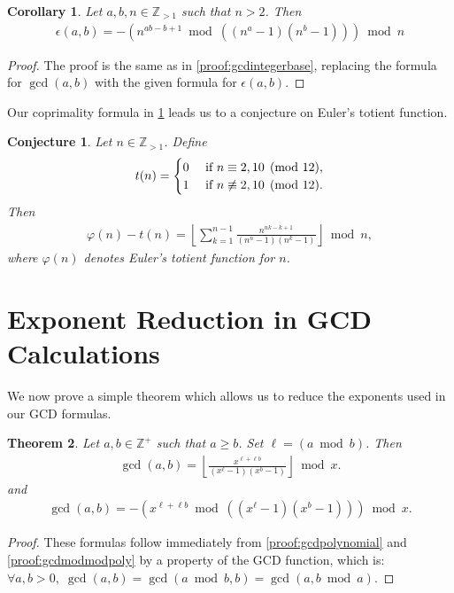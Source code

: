 \documentclass{article}
\theoremstyle{plain}
\newtheorem{conjecture}{Conjecture}
\newtheorem{theorem}{Theorem}
\newtheorem{corollary}[theorem]{Corollary}
\theoremstyle{definition}
\newcommand{\floor}[1]{\left\lfloor #1 \right\rfloor}
\newcommand{\coprime}{\epsilon}
\newcommand{\Z}{\mathbb{Z}}
\begin{document}
\begin{corollary} \label{proof:coprimalityfunctionintegerbase}
Let $a,b,n \in \Z_{>1}$ such that $n > 2$. Then
\begin{align*}
    \coprime(a,b) = -\left( n^{ab-b+1} \bmod \left((n^a-1)(n^b-1)\right) \right) \bmod n 
\end{align*}
\end{corollary}
\begin{proof}
The proof is the same as in \cref{proof:gcdintegerbase}, replacing the formula for $\gcd(a,b)$ with the given formula for $\coprime(a,b)$.
\end{proof}

Our coprimality formula in \cref{proof:coprimalityfunctionintegerbase} leads us to a conjecture on Euler's totient function.
\begin{conjecture}
Let $n \in \Z_{>1}$. Define
\begin{align*}
t(n) =
\begin{cases}
    0 & \textup{ if } n \equiv 2,10 \pmod{12} , \\
    1 & \textup{ if } n \not\equiv 2,10 \pmod{12} .
\end{cases}
\end{align*}
Then
\begin{align*}
\varphi(n) - t(n) =
\floor{\sum_{k=1}^{n-1} \frac{n^{nk-k+1}}{(n^n-1)(n^k-1)}}
\bmod n ,
\end{align*}
where $\varphi(n)$ denotes Euler's totient function for $n$.
\end{conjecture}

\section{Exponent Reduction in GCD Calculations}
We now prove a simple theorem which allows us to reduce the exponents used in our GCD formulas.

\begin{theorem} \label{proof:exponentreduction}
Let $a,b \in \Z^+$ such that $a \geq b$. Set $\ell = (a \bmod b)$. Then
\begin{align*}
\gcd(a,b) = \floor{\frac{x^{\ell + \ell b}}{(x^\ell-1)(x^b-1)}}\bmod x .
\end{align*}
and
\begin{align*}
\gcd(a,b) = -\left( x^{\ell+\ell b} \bmod \left((x^{\ell}-1)(x^b-1)\right) \right) \bmod x .
\end{align*}
\end{theorem}
\begin{proof}
These formulas follow immediately from \cref{proof:gcdpolynomial} and \cref{proof:gcdmodmodpoly} by a property of the GCD function, which is: $\forall a,b > 0, \; \gcd(a,b) = \gcd(a \bmod b, b) = \gcd(a, b \bmod a)$.
\end{proof}
\end{document}

